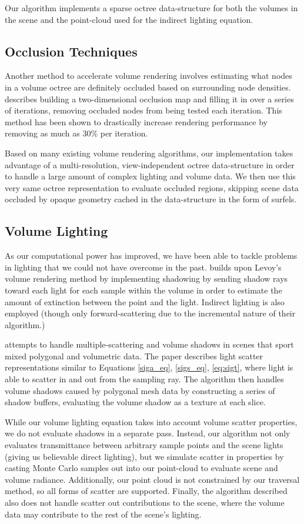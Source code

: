 \documentclass[12pt]{ucthesis}
\begin{document}
Our algorithm implements a sparse octree data-structure for both the volumes in the scene and the point-cloud used for the indirect lighting equation.

\subsection{Occlusion Techniques}
Another method to accelerate volume rendering involves estimating what nodes in a volume octree are definitely occluded based on surrounding node densities.  \cite{guthe} describes building a two-dimensional occlusion map and filling it in over a series of iterations, removing occluded nodes from being tested each iteration.  This method has been shown to drastically increase rendering performance by removing as much as 30\% per iteration.

Based on many existing volume rendering algorithms, our implementation takes advantage of a multi-resolution, view-independent octree data-structure in order to handle a large amount of complex lighting and volume data.  We then use this very same octree representation to evaluate occluded regions, skipping scene data occluded by opaque geometry cached in the data-structure in the form of surfels.

\subsection{Volume Lighting}
As our computational power has improved, we have been able to tackle problems in lighting that we could not have overcome in the past.  \cite{kniss:03} builds upon Levoy's volume rendering method by implementing shadowing by sending shadow rays toward each light for each sample within the volume in order to estimate the amount of extinction between the point and the light.  Indirect lighting is also employed (though only forward-scattering due to the incremental nature of their algorithm.)

\cite{zhang} attempts to handle multiple-scattering and volume shadows in scenes that sport mixed polygonal and volumetric data.  The paper describes light scatter representations similar to Equations \ref{siga_eq}, \ref{sigs_eq}, \ref{eq:sigt}, where light is able to scatter in and out from the sampling ray.  The algorithm then handles volume shadows caused by polygonal mesh data by constructing a series of shadow buffers, evaluating the volume shadow as a texture at each slice.

While our volume lighting equation takes into account volume scatter properties, we do not evaluate shadows in a separate pass.  Instead, our algorithm not only evaluates transmittance between arbitrary sample points and the scene lights (giving us believable direct lighting), but we simulate scatter in properties by casting Monte Carlo samples out into our point-cloud to evaluate scene and volume radiance.  Additionally, our point cloud is not constrained by our traversal method, so all forms of scatter are supported.  Finally, the algorithm described also does not handle scatter out contributions to the scene, where the volume data may contribute to the rest of the scene's lighting.
\end{document}
